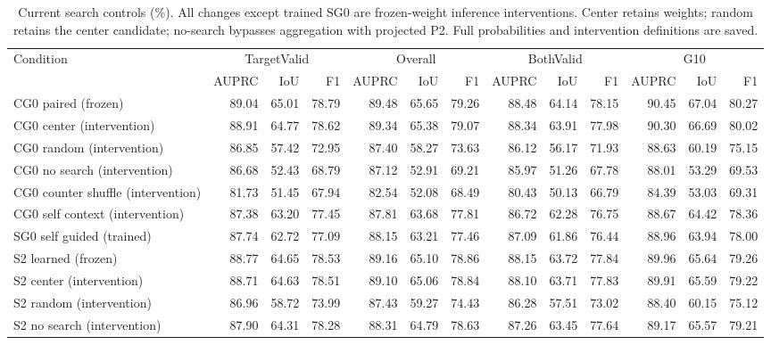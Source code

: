 \begin{table}[!t]
\caption{Current search controls (\%). All changes except trained SG0 are frozen-weight inference interventions. Center retains weights; random retains the center candidate; no-search bypasses aggregation with projected P2. Full probabilities and intervention definitions are saved.}
\label{tab:search_intervention}
\centering\scriptsize
\setlength{\tabcolsep}{3pt}
\begin{tabular}{lrrrrrrrrrrrr}
\toprule
Condition & \multicolumn{3}{c}{TargetValid} & \multicolumn{3}{c}{Overall} & \multicolumn{3}{c}{BothValid} & \multicolumn{3}{c}{G10}\\
 & AUPRC & IoU & F1 & AUPRC & IoU & F1 & AUPRC & IoU & F1 & AUPRC & IoU & F1\\
\midrule
CG0 paired (frozen) & 89.04 & 65.01 & 78.79 & 89.48 & 65.65 & 79.26 & 88.48 & 64.14 & 78.15 & 90.45 & 67.04 & 80.27\\
CG0 center (intervention) & 88.91 & 64.77 & 78.62 & 89.34 & 65.38 & 79.07 & 88.34 & 63.91 & 77.98 & 90.30 & 66.69 & 80.02\\
CG0 random (intervention) & 86.85 & 57.42 & 72.95 & 87.40 & 58.27 & 73.63 & 86.12 & 56.17 & 71.93 & 88.63 & 60.19 & 75.15\\
CG0 no search (intervention) & 86.68 & 52.43 & 68.79 & 87.12 & 52.91 & 69.21 & 85.97 & 51.26 & 67.78 & 88.01 & 53.29 & 69.53\\
CG0 counter shuffle (intervention) & 81.73 & 51.45 & 67.94 & 82.54 & 52.08 & 68.49 & 80.43 & 50.13 & 66.79 & 84.39 & 53.03 & 69.31\\
CG0 self context (intervention) & 87.38 & 63.20 & 77.45 & 87.81 & 63.68 & 77.81 & 86.72 & 62.28 & 76.75 & 88.67 & 64.42 & 78.36\\
SG0 self guided (trained) & 87.74 & 62.72 & 77.09 & 88.15 & 63.21 & 77.46 & 87.09 & 61.86 & 76.44 & 88.96 & 63.94 & 78.00\\
S2 learned (frozen) & 88.77 & 64.65 & 78.53 & 89.16 & 65.10 & 78.86 & 88.15 & 63.72 & 77.84 & 89.96 & 65.64 & 79.26\\
S2 center (intervention) & 88.71 & 64.63 & 78.51 & 89.10 & 65.06 & 78.84 & 88.10 & 63.71 & 77.83 & 89.91 & 65.59 & 79.22\\
S2 random (intervention) & 86.96 & 58.72 & 73.99 & 87.43 & 59.27 & 74.43 & 86.28 & 57.51 & 73.02 & 88.40 & 60.15 & 75.12\\
S2 no search (intervention) & 87.90 & 64.31 & 78.28 & 88.31 & 64.79 & 78.63 & 87.26 & 63.45 & 77.64 & 89.17 & 65.57 & 79.21\\
\bottomrule
\end{tabular}
\end{table}
